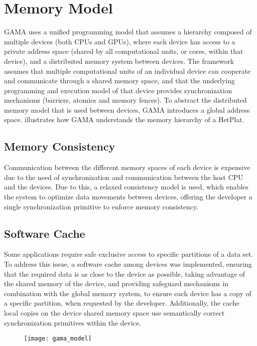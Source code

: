 \documentclass[main.tex]{subfiles}
\begin{document}
\section{Memory Model}

\acs{GAMA} uses a unified programming model that assumes a hierarchy composed of multiple devices (both \acsp{CPU} and \acsp{GPU}), where each device has access to a private address space (shared by all computational units, or cores, within that device), and a distributed memory system between devices. The framework assumes that multiple computational units of an individual device can cooperate and communicate through a shared memory space, and that the underlying programming and execution model of that device provides synchronization mechanisms (barriers, atomics and memory fences).
To abstract the distributed memory model that is used between devices, \acs{GAMA} introduces a global address space.  illustrates how \acs{GAMA} understands the memory hierarchy of a \acs{HetPlat}.


\subsection{Memory Consistency}

Communication between the different memory spaces of each device is expensive due to the need of synchronization and communication between the host \ac{CPU} and the devices. Due to this, a relaxed consistency model is used, which enables the system to optimize data movements between devices, offering the developer a single synchronization primitive to enforce memory consistency.

\subsection{Software Cache}

Some applications require safe exclusive access to specific partitions of a data set. To address this issue, a software cache among devices was implemented, ensuring that the required data is as close to the device as possible, taking advantage of the shared memory of the device, and providing safeguard mechanisms in combination with the global memory system, to ensure each device has a copy of a specific partition, when requested by the developer. Additionally, the cache local copies on the device shared memory space use semantically correct synchronization primitives within the device.

\begin{figure}[!htp]
  \centering
  \texttt{[image: gama\_model]}
  \caption{\label{fig:gama_memory_model}}
\end{figure}
\end{document}
